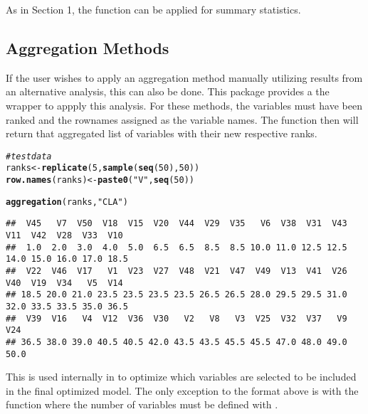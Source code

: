 \documentclass[12pt]{article}\usepackage[]{graphicx}\usepackage[usenames,dvipsnames]{color}
\makeatletter
\newcommand{\hlnum}[1]{\textcolor[rgb]{0.686,0.059,0.569}{#1}}%
\newcommand{\hlstr}[1]{\textcolor[rgb]{0.192,0.494,0.8}{#1}}%
\newcommand{\hlcom}[1]{\textcolor[rgb]{0.678,0.584,0.686}{\textit{#1}}}%
\newcommand{\hlstd}[1]{\textcolor[rgb]{0.345,0.345,0.345}{#1}}%
\newcommand{\hlkwb}[1]{\textcolor[rgb]{0.69,0.353,0.396}{#1}}%
\newcommand{\hlkwd}[1]{\textcolor[rgb]{0.737,0.353,0.396}{\textbf{#1}}}%
\newenvironment{kframe}{%
 \def\at@end@of@kframe{}%
 \ifinner\ifhmode%
  \def\at@end@of@kframe{\end{minipage}}%
  \begin{minipage}{\columnwidth}%
 \fi\fi%
 \def\FrameCommand##1{\hskip\@totalleftmargin \hskip-\fboxsep
 \colorbox{shadecolor}{##1}\hskip-\fboxsep
     \hskip-\linewidth \hskip-\@totalleftmargin \hskip\columnwidth}%
 \MakeFramed {\advance\hsize-\width
   \@totalleftmargin\z@ \linewidth\hsize
   \@setminipage}}%
 {\par\unskip\endMakeFramed%
 \at@end@of@kframe}
\newenvironment{knitrout}{}{} %
\makeatother
\begin{document}
As in Section 1, the  function can be applied
for summary statistics.

\newpage
\subsection{Aggregation Methods}

If the user wishes to apply an aggregation method manually utilizing results
from an alternative analysis, this can also be done.  This package provides
a the wrapper  to appply this analysis.  For these 
methods, the variables must have been ranked and the rownames assigned as the
variable names.  The function then will return that aggregated list of 
variables with their new respective ranks.

\begin{knitrout}
\color{fgcolor}\begin{kframe}
\begin{alltt}
\hlcom{# test data}
\hlstd{ranks} \hlkwb{<-} \hlkwd{replicate}\hlstd{(}\hlnum{5}\hlstd{,} \hlkwd{sample}\hlstd{(}\hlkwd{seq}\hlstd{(}\hlnum{50}\hlstd{),} \hlnum{50}\hlstd{))}
\hlkwd{row.names}\hlstd{(ranks)} \hlkwb{<-} \hlkwd{paste0}\hlstd{(}\hlstr{"V"}\hlstd{,} \hlkwd{seq}\hlstd{(}\hlnum{50}\hlstd{))}

\hlkwd{aggregation}\hlstd{(ranks,} \hlstr{"CLA"}\hlstd{)}
\end{alltt}
\begin{verbatim}
##  V45   V7  V50  V18  V15  V20  V44  V29  V35   V6  V38  V31  V43  V11  V42  V28  V33  V10 
##  1.0  2.0  3.0  4.0  5.0  6.5  6.5  8.5  8.5 10.0 11.0 12.5 12.5 14.0 15.0 16.0 17.0 18.5 
##  V22  V46  V17   V1  V23  V27  V48  V21  V47  V49  V13  V41  V26  V40  V19  V34   V5  V14 
## 18.5 20.0 21.0 23.5 23.5 23.5 23.5 26.5 26.5 28.0 29.5 29.5 31.0 32.0 33.5 33.5 35.0 36.5 
##  V39  V16   V4  V12  V36  V30   V2   V8   V3  V25  V32  V37   V9  V24 
## 36.5 38.0 39.0 40.5 40.5 42.0 43.5 43.5 45.5 45.5 47.0 48.0 49.0 50.0
\end{verbatim}
\end{kframe}
\end{knitrout}

This is used internally in  to optimize which
variables are selected to be included in the final optimized model.  The only
exception to the format above is with the  function where the 
number of variables must be defined with .
\end{document}
